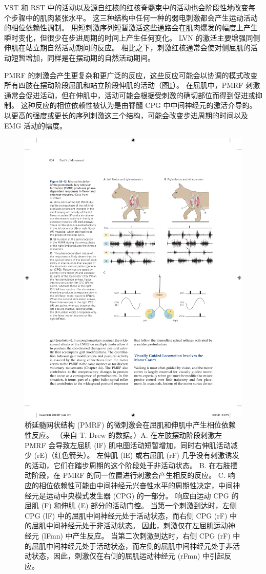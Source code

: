 VST 和 RST 中的活动以及源自红核的红核脊髓束中的活动也会阶段性地改变每个步骤中的肌肉紧张水平。 这三种结构中任何一种的弱电刺激都会产生运动活动的相位依赖性调制。 用短刺激序列短暂激活这些通路会在肌肉爆发的幅度上产生瞬时变化，但很少在步进周期的时间上产生任何变化。 LVN 的激活主要增强同侧伸肌在站立期自然活动期间的反应。 相比之下，刺激红核通常会使对侧屈肌的活动短暂增加，同样是在摆动期的自然活动期间。

PMRF 的刺激会产生更复杂和更广泛的反应，这些反应可能会以协调的模式改变所有四肢在摆动阶段屈肌和站立阶段伸肌的活动（图\ref{fig:33_13}）。
在屈肌中，PMRF 刺激通常会促进活动，但在伸肌中，活动可能会根据受刺激的确切部位而得到促进或抑制。 这种反应的相位依赖性被认为是由脊髓 CPG 中中间神经元的激活介导的。 以更高的强度或更长的序列刺激这三个结构，可能会改变步进周期的时间以及 EMG 活动的幅度。

\begin{figure}[htbp]
	\centering
	\includegraphics[width=0.7\linewidth]{chap33/fig_33_13}
	\caption{桥延髓网状结构 (PMRF) 的微刺激会在屈肌和伸肌中产生相位依赖性反应。 （来自 T. Drew 的数据。）A. 在左肢摆动阶段刺激左 PMRF 会导致左屈肌 (lF) 肌电图活动短暂增加，同时右伸肌活动减少 (rE)（红色箭头）。 左伸肌 (lE) 或右屈肌 (rF) 几乎没有刺激诱发的活动，它们在踏步周期的这个阶段处于非活动状态。 B. 在右肢摆动阶段，在 PMRF 的同一位置进行刺激会产生相反的反应。 C. 响应的相位依赖性可能由中间神经元兴奋性水平的周期性决定，中间神经元是运动中央模式发生器 (CPG) 的一部分。 响应由运动 CPG 的屈肌 (F) 和伸肌 (E) 部分的活动门控。 当第一个刺激到达时，左侧 CPG (lF) 中的屈肌中间神经元处于活动状态，而右侧 CPG (rF) 中的屈肌中间神经元处于非活动状态。 因此，刺激仅在左屈肌运动神经元 (lFmn) 中产生反应。 当第二次刺激到达时，右侧 CPG (rF) 中的屈肌中间神经元处于活动状态，而左侧的屈肌中间神经元处于非活动状态，因此，刺激仅在右侧的屈肌运动神经元 (rFmn) 中引起反应。}
	\label{fig:33_13}
\end{figure}

